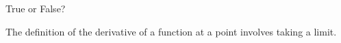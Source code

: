 \documentclass{ximera}
\author{Gregory Hartman \and Matthew Carr}
\begin{document}
\begin{exercise}




True or False?
\begin{center}
The definition of the derivative of a function at a point involves taking a limit.
\end{center}

\begin{prompt}
\begin{multipleChoice}
\end{multipleChoice}
\end{prompt}


\end{exercise}
\end{document}
